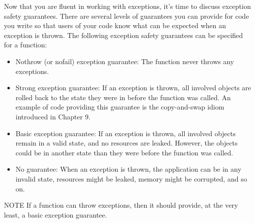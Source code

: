 Now that you are fluent in working with exceptions, it’s time to discuss exception safety guarantees. There are several levels of guarantees you can provide for code you write so that users of your code know what can be expected when an exception is thrown. The following exception safety guarantees can be specified for a function:

\begin{itemize}
\item
Nothrow (or nofail) exception guarantee: The function never throws any exceptions.

\item
Strong exception guarantee: If an exception is thrown, all involved objects are rolled back to the state they were in before the function was called. An example of code providing this guarantee is the copy-and-swap idiom introduced in Chapter 9.

\item
Basic exception guarantee: If an exception is thrown, all involved objects remain in a valid state, and no resources are leaked. However, the objects could be in another state than they were before the function was called.

\item
No guarantee: When an exception is thrown, the application can be in any invalid state, resources might be leaked, memory might be corrupted, and so on.
\end{itemize}

\begin{myNotic}{NOTE}
If a function can throw exceptions, then it should provide, at the very least, a basic exception guarantee.
\end{myNotic}